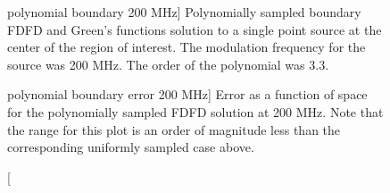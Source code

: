\documentclass [11 pt, titlepage]{article}
\begin{document}
\begin {figure}
\begin {minipage}[t]{3.0in}
    \begin {center}
     \caption
    [polynomial boundary 200 MHz] {Polynomially sampled boundary FDFD
    and Green's functions solution to a single point source at the
    center of the region of interest.  The modulation frequency for
    the source was 200 MHz.  The order of the polynomial was 3.3.}
\end {center}
\end {minipage}\hfill
\begin {minipage}[t]{3.0in}
    \begin {center}
     \caption
    [polynomial boundary error 200 MHz] {Error as a function of space
    for the polynomially sampled FDFD solution at 200 MHz.  Note that
    the range for this plot is an order of magnitude less than the
    corresponding uniformly sampled case above.}
    \end {center}
\end {minipage}
\end {figure}
\end{document}
